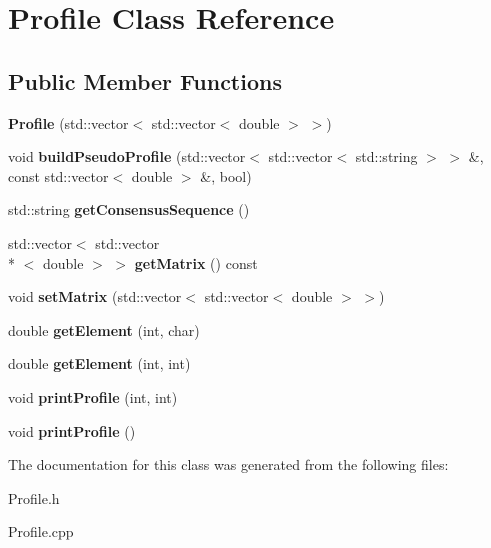 \hypertarget{class_profile}{\section{Profile Class Reference}
\label{class_profile}
}
\subsection*{Public Member Functions}
\begin{DoxyCompactItemize}
\item 
\hypertarget{class_profile_a91b255aa0331ebe6a07792227b49ff90}{{\bfseries Profile} (std\+::vector$<$ std\+::vector$<$ double $>$ $>$)}\label{class_profile_a91b255aa0331ebe6a07792227b49ff90}

\item 
\hypertarget{class_profile_aefac6e9eb20e088dad4ec4e23f1935c9}{void {\bfseries build\+Pseudo\+Profile} (std\+::vector$<$ std\+::vector$<$ std\+::string $>$ $>$ \&, const std\+::vector$<$ double $>$ \&, bool)}\label{class_profile_aefac6e9eb20e088dad4ec4e23f1935c9}

\item 
\hypertarget{class_profile_aa6d66ff32ce83ffb147dd47051394bf2}{std\+::string {\bfseries get\+Consensus\+Sequence} ()}\label{class_profile_aa6d66ff32ce83ffb147dd47051394bf2}

\item 
\hypertarget{class_profile_aec0d64f9aaf22000aad976d582e5d91c}{std\+::vector$<$ std\+::vector\\*
$<$ double $>$ $>$ {\bfseries get\+Matrix} () const }\label{class_profile_aec0d64f9aaf22000aad976d582e5d91c}

\item 
\hypertarget{class_profile_ab56989c6b5f422987670bc537a8a7daa}{void {\bfseries set\+Matrix} (std\+::vector$<$ std\+::vector$<$ double $>$ $>$)}\label{class_profile_ab56989c6b5f422987670bc537a8a7daa}

\item 
\hypertarget{class_profile_a87439e0d1e0d4b1052daa304c9d1de97}{double {\bfseries get\+Element} (int, char)}\label{class_profile_a87439e0d1e0d4b1052daa304c9d1de97}

\item 
\hypertarget{class_profile_a4d148ce1e2194b09470dde53f8df3a50}{double {\bfseries get\+Element} (int, int)}\label{class_profile_a4d148ce1e2194b09470dde53f8df3a50}

\item 
\hypertarget{class_profile_a01266916fcfc7a0db5b0cc709ee1fd24}{void {\bfseries print\+Profile} (int, int)}\label{class_profile_a01266916fcfc7a0db5b0cc709ee1fd24}

\item 
\hypertarget{class_profile_a744e377c2c4d05968c662fff68b7f6ce}{void {\bfseries print\+Profile} ()}\label{class_profile_a744e377c2c4d05968c662fff68b7f6ce}

\end{DoxyCompactItemize}


The documentation for this class was generated from the following files\+:\begin{DoxyCompactItemize}
\item 
Profile.\+h\item 
Profile.\+cpp\end{DoxyCompactItemize}
